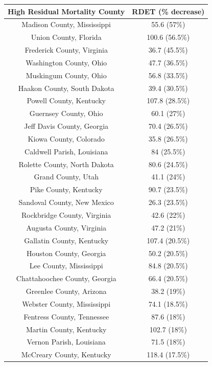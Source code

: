 \begin{table}[ht]
\centering
\begin{tabular}{cc}
  \toprule
High Residual Mortality County & RDET (\% decrease) \\ 
  \midrule
Madison County, Mississippi & 55.6 (57\%) \\ 
  Union County, Florida & 100.6 (56.5\%) \\ 
  Frederick County, Virginia & 36.7 (45.5\%) \\ 
  Washington County, Ohio & 47.7 (36.5\%) \\ 
  Muskingum County, Ohio & 56.8 (33.5\%) \\ 
  Haakon County, South Dakota & 39.4 (30.5\%) \\ 
  Powell County, Kentucky & 107.8 (28.5\%) \\ 
  Guernsey County, Ohio & 60.1 (27\%) \\ 
  Jeff Davis County, Georgia & 70.4 (26.5\%) \\ 
  Kiowa County, Colorado & 35.8 (26.5\%) \\ 
  Caldwell Parish, Louisiana & 84 (25.5\%) \\ 
  Rolette County, North Dakota & 80.6 (24.5\%) \\ 
  Grand County, Utah & 41.1 (24\%) \\ 
  Pike County, Kentucky & 90.7 (23.5\%) \\ 
  Sandoval County, New Mexico & 26.3 (23.5\%) \\ 
  Rockbridge County, Virginia & 42.6 (22\%) \\ 
  Augusta County, Virginia & 47.2 (21\%) \\ 
  Gallatin County, Kentucky & 107.4 (20.5\%) \\ 
  Houston County, Georgia & 50.2 (20.5\%) \\ 
  Lee County, Mississippi & 84.8 (20.5\%) \\ 
  Chattahoochee County, Georgia & 66.4 (20.5\%) \\ 
  Greenlee County, Arizona & 38.2 (19\%) \\ 
  Webster County, Mississippi & 74.1 (18.5\%) \\ 
  Fentress County, Tennessee & 87.6 (18\%) \\ 
  Martin County, Kentucky & 102.7 (18\%) \\ 
  Vernon Parish, Louisiana & 71.5 (18\%) \\ 
  McCreary County, Kentucky & 118.4 (17.5\%) \\ 

\end{tabular}
\end{table}
